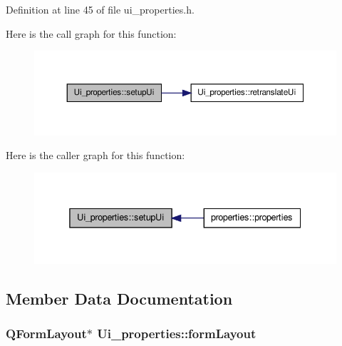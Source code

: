 Definition at line 45 of file ui\_\-properties.h.



Here is the call graph for this function:
\nopagebreak
\begin{figure}[H]
\begin{center}
\leavevmode
\includegraphics[width=366pt]{classUi__properties_a03ce4f30d999c6f436cfcba2c71153f5_cgraph}
\end{center}
\end{figure}




Here is the caller graph for this function:
\nopagebreak
\begin{figure}[H]
\begin{center}
\leavevmode
\includegraphics[width=338pt]{classUi__properties_a03ce4f30d999c6f436cfcba2c71153f5_icgraph}
\end{center}
\end{figure}




\subsection{Member Data Documentation}
\hypertarget{classUi__properties_a879a624d84a2c970aa6ec8f6409bc0b1}{
\subsubsection[{formLayout}]{\setlength{\rightskip}{0pt plus 5cm}QFormLayout$\ast$ {\bf Ui\_\-properties::formLayout}}}
\label{classUi__properties_a879a624d84a2c970aa6ec8f6409bc0b1}


